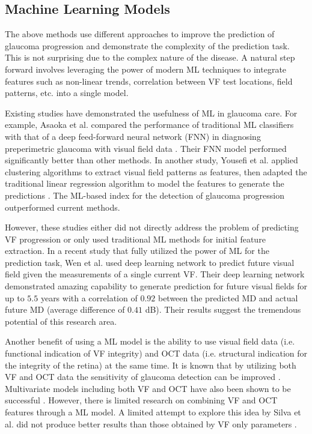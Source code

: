 \subsection{Machine Learning Models}

The above methods use different approaches to improve the prediction of glaucoma progression and demonstrate the complexity of the prediction task. This is not surprising due to the complex nature of the disease. A natural step forward involves leveraging the power of modern \acl{ML} techniques to integrate features such as non-linear trends, correlation between \acl{VF} test locations, field patterns, etc. into a single model.
 
Existing studies have demonstrated the usefulness of \acl{ML} in glaucoma care. For example, Asaoka et al. compared the performance of traditional \acl{ML} classifiers with that of a deep feed-forward neural network (FNN) in diagnosing preperimetric glaucoma with visual field data \cite{Asaoka2016}. Their FNN model performed significantly better than other methods. In another study, Yousefi et al. applied clustering algorithms to extract visual field patterns as features, then adapted the traditional linear regression algorithm to model the features to generate the predictions \cite{Yousefi2018}. The \acl{ML}-based index for the detection of glaucoma progression outperformed current methods. 

However, these studies either did not directly address the problem of predicting \acl{VF} progression or only used traditional \acl{ML} methods for initial feature extraction. In a recent study that fully utilized the power of \acl{ML} for the prediction task, Wen et al. \cite{Wen2018} used deep learning network to predict future visual field given the measurements of a single current \acl{VF}. Their deep learning network demonstrated amazing capability to generate prediction for future visual fields for up to $5.5$ years with a correlation of $0.92$ between the predicted \ac{MD} and actual future \ac{MD} (average difference of $0.41$ dB). Their results suggest the tremendous potential of this research area. 

Another benefit of using a \acl{ML} model is the ability to use visual field data (i.e. functional indication of \acl{VF} integrity) and \ac{OCT} data (i.e. structural indication for the integrity of the retina) at the same time. It is known that by utilizing both \acl{VF} and \ac{OCT} data the sensitivity of glaucoma detection can be improved \cite{Shah2006,Lu2008}. Multivariate models including both \acl{VF} and \ac{OCT} have also been shown to be successful \cite{Mwanza2013}. However, there is limited research on combining \acl{VF} and \ac{OCT} features through a \acl{ML} model. A limited attempt to explore this idea by Silva et al. did not produce better results than those obtained by \acl{VF} only parameters \cite{Silva2013}. 

